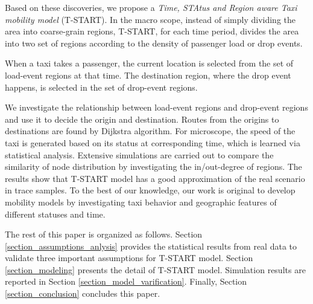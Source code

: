 Based on these discoveries, we propose a \emph{Time, STAtus and Region aware Taxi mobility model} (T-START). In the macro scope, instead of simply dividing the area into coarse-grain regions, T-START, for each time period, divides the area into two set of regions according to the density of passenger load or drop events.

When a taxi takes a passenger, the current location is selected from the set of load-event regions at that time. The destination region, where the drop event happens, is selected in the set of drop-event regions.

We investigate the relationship between load-event regions and drop-event regions and use it to decide the origin and destination. Routes from the origins to destinations are found by Dijkstra algorithm. For microscope, the speed of the taxi is generated based on its status at corresponding time, which is learned via statistical analysis. Extensive simulations are carried out to compare the similarity of node distribution by investigating the in/out-degree of regions. The results show that T-START model has a good approximation of the real scenario in trace samples. To the best of our knowledge, our work is original to develop mobility models by investigating taxi behavior and geographic features of different statuses and time.

The rest of this paper is organized as follows. Section \ref{section_assumptions_anlysis} provides the statistical results from real data to validate three important assumptions for T-START model. Section \ref{section_modeling} presents the detail of T-START model. Simulation results are reported in Section \ref{section_model_varification}. Finally, Section \ref{section_conclusion} concludes this paper.


